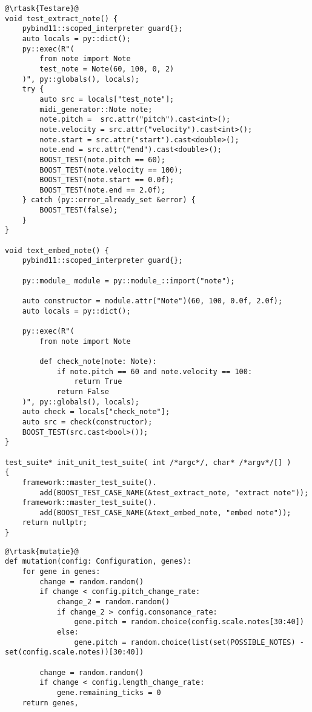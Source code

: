 \begin{verbatim}
@\rtask{Testare}@
void test_extract_note() {
    pybind11::scoped_interpreter guard{};
    auto locals = py::dict();
    py::exec(R"(
        from note import Note
        test_note = Note(60, 100, 0, 2)
    )", py::globals(), locals);
    try {
        auto src = locals["test_note"];
        midi_generator::Note note;
        note.pitch =  src.attr("pitch").cast<int>();
        note.velocity = src.attr("velocity").cast<int>();
        note.start = src.attr("start").cast<double>();
        note.end = src.attr("end").cast<double>();
        BOOST_TEST(note.pitch == 60);
        BOOST_TEST(note.velocity == 100);
        BOOST_TEST(note.start == 0.0f);
        BOOST_TEST(note.end == 2.0f);
    } catch (py::error_already_set &error) {
        BOOST_TEST(false);
    }
}

void text_embed_note() {
    pybind11::scoped_interpreter guard{};

    py::module_ module = py::module_::import("note");

    auto constructor = module.attr("Note")(60, 100, 0.0f, 2.0f);
    auto locals = py::dict();

    py::exec(R"(
        from note import Note

        def check_note(note: Note):
            if note.pitch == 60 and note.velocity == 100:
                return True
            return False
    )", py::globals(), locals);
    auto check = locals["check_note"];
    auto src = check(constructor);
    BOOST_TEST(src.cast<bool>());
}

test_suite* init_unit_test_suite( int /*argc*/, char* /*argv*/[] )
{
    framework::master_test_suite().
        add(BOOST_TEST_CASE_NAME(&test_extract_note, "extract note"));
    framework::master_test_suite().
        add(BOOST_TEST_CASE_NAME(&text_embed_note, "embed note"));
    return nullptr;
}
\end{verbatim}

\begin{verbatim}
@\rtask{mutație}@
def mutation(config: Configuration, genes):
    for gene in genes:
        change = random.random()
        if change < config.pitch_change_rate:
            change_2 = random.random()
            if change_2 > config.consonance_rate:
                gene.pitch = random.choice(config.scale.notes[30:40])
            else:
                gene.pitch = random.choice(list(set(POSSIBLE_NOTES) - set(config.scale.notes))[30:40])

        change = random.random()
        if change < config.length_change_rate:
            gene.remaining_ticks = 0
    return genes,
\end{verbatim}

